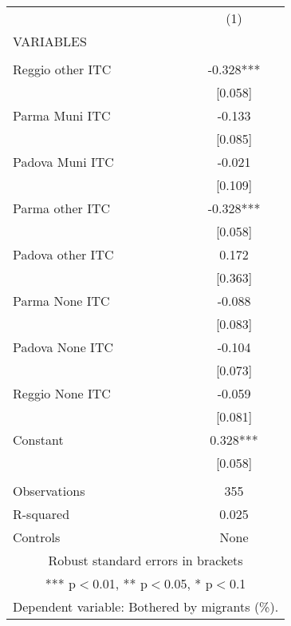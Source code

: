 \begin{tabular}{lc} \hline
 & (1) \\
VARIABLES &  \\ \hline
 &  \\
Reggio other ITC & -0.328*** \\
 & [0.058] \\
Parma Muni ITC & -0.133 \\
 & [0.085] \\
Padova Muni ITC & -0.021 \\
 & [0.109] \\
Parma other ITC & -0.328*** \\
 & [0.058] \\
Padova other ITC & 0.172 \\
 & [0.363] \\
Parma None ITC & -0.088 \\
 & [0.083] \\
Padova None ITC & -0.104 \\
 & [0.073] \\
Reggio None ITC & -0.059 \\
 & [0.081] \\
Constant & 0.328*** \\
 & [0.058] \\
 &  \\
Observations & 355 \\
R-squared & 0.025 \\
 Controls & None \\ \hline
\multicolumn{2}{c}{ Robust standard errors in brackets} \\
\multicolumn{2}{c}{ *** p$<$0.01, ** p$<$0.05, * p$<$0.1} \\
\multicolumn{2}{c}{ Dependent variable: Bothered by migrants (\%).} \\
\end{tabular}
